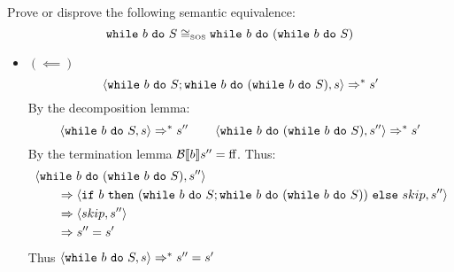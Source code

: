 \begin{exercise}{
    Prove or disprove the following semantic equivalence:
    \[ \texttt{while}\ b\ \texttt{do}\ S \cong_{\text{\tiny SOS}} \texttt{while}\ b\ \texttt{do}\ (\texttt{while}\ b\ \texttt{do}\ S)  \]\vspace*{-0.6cm}
}
\begin{itemize}
\begin{itemize}
                    \begin{align*}
                        &\instr{\wwhile{b}{S}; \wwhile{b}{(\wwhile{b}{S})}}{s}
                        \\&\qquad\Rightarrow^* \instr{\wwhile{b}{(\wwhile{b}{S})}}{s'}
                        \\&\qquad\Rightarrow \instr{\wif{b}{(\wwhile{b}{S}; \wwhile{b}{(\wwhile{b}{S})})}{skip}}{s'}
                        \\&\qquad\Rightarrow \instr{skip}{s'}
                        \\&\qquad\Rightarrow s'
                    \end{align*}
                \item $(\impliedby)$
                    \[ \left<\texttt{while}\ b\ \texttt{do}\ S; \texttt{while}\ b\ \texttt{do}\ (\texttt{while}\ b\ \texttt{do}\ S), s\right> \Rightarrow^* s' \]
                    By the decomposition lemma:
                    \[
                        \left<\texttt{while}\ b\ \texttt{do}\ S, s\right> \Rightarrow^* s''
                        \qquad
                        \left<\texttt{while}\ b\ \texttt{do}\ (\texttt{while}\ b\ \texttt{do}\ S), s''\right> \Rightarrow^* s'
                    \]
                    By the termination lemma $\mathcal{B} \llbracket b \rrbracket s'' = \text{ff}$. Thus:
                    \begin{align*}
                        &\left<\texttt{while}\ b\ \texttt{do}\ (\texttt{while}\ b\ \texttt{do}\ S), s''\right>
                        \\&\qquad\Rightarrow \left<\texttt{if}\ b\ \texttt{then}\ (\texttt{while}\ b\ \texttt{do}\ S; \texttt{while}\ b\ \texttt{do}\ (\texttt{while}\ b\ \texttt{do}\ S))\ \texttt{else}\ skip, s''\right>
                        \\&\qquad\Rightarrow \left<skip, s''\right>
                        \\&\qquad\Rightarrow s'' = s'
                    \end{align*}
                    Thus $\left<\texttt{while}\ b\ \texttt{do}\ S, s\right> \Rightarrow^* s'' = s'$
            \end{itemize}
    \end{itemize}
\end{exercise}
